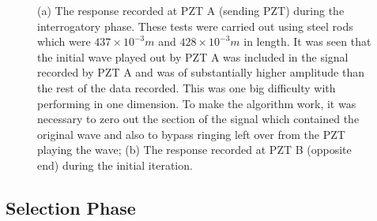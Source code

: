 \begin{figure}
\begin{subfigmatrix}{2}
\end{subfigmatrix}

  \caption
  { \label{fig:initialPhaseRead}
(a) The response recorded at PZT A (sending PZT) during the interrogatory phase. These tests were carried out using steel rods which were $437 \times 10^{-3} m$ and $428 \times 10^{-3} m$ in length. It was seen that the initial wave played out by PZT A was included in the signal recorded by PZT A and was of substantially higher amplitude than the rest of the data recorded. This was one big difficulty with performing in one dimension. To make the algorithm work, it was necessary to zero out the section of the signal which contained the original wave and also to bypass ringing left over from the PZT playing the wave;
(b) The response recorded at PZT B (opposite end) during the initial iteration.
}
\end{figure}

\subsection{Selection Phase}


